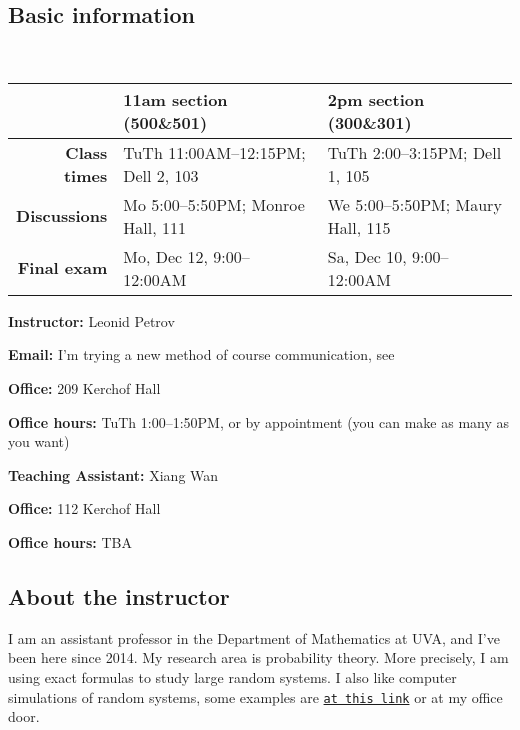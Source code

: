 \documentclass[oneside,11pt]{amsart}
\begin{document}
\subsection{Basic information}{\ }

\vspace{5pt}

\begin{tabular}{r|l|l}
	\hline
	&\textbf{11am section (500\&501)} & \textbf{2pm section (300\&301)}
	\\\hline
	\textbf{Class times}&TuTh 11:00AM--12:15PM; Dell 2, 103 & TuTh 2:00--3:15PM; Dell 1, 105 
	\\\hline
	\textbf{Discussions}&Mo 5:00--5:50PM; Monroe Hall, 111
	&
	We 5:00--5:50PM; Maury Hall, 115
	\\\hline
	\textbf{Final exam}&
	Mo, Dec 12, 9:00--12:00AM&
	Sa, Dec 10,	9:00--12:00AM
	\\\hline
\end{tabular}

\vspace{10pt}

\parbox{.5\textwidth}{

\textbf{Instructor:} Leonid Petrov

\textbf{Email:} I'm trying a new method of course communication, see 

\textbf{Office:} 209 Kerchof Hall

\textbf{Office hours:} TuTh 1:00--1:50PM,
or by appointment (you can make as many as you want)}\hspace{30pt}
\parbox{.4\textwidth}{

\textbf{Teaching Assistant:} Xiang Wan

\textbf{Office:} 112 Kerchof Hall

\textbf{Office hours:} TBA}

\vspace{5pt}

\subsection{About the instructor}
I am an assistant professor in the Department of Mathematics at UVA, and I've been here since 2014. My research area is probability theory. More precisely, I am using exact formulas to study large random systems. I also like computer simulations of random systems, some examples are \href{http://faculty.virginia.edu/petrov//blog/2015/02/20/Shapes%20with%20holes/}{\texttt{at this link}} or at my office door.
\end{document}
